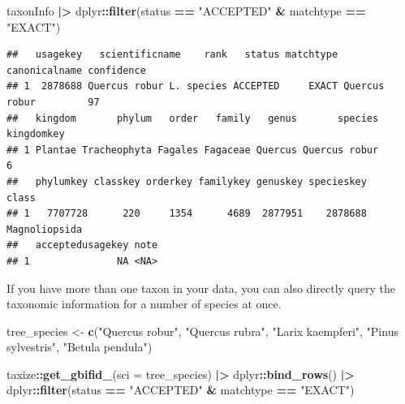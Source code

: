 \documentclass[
]{book}
\newenvironment{Shaded}{\begin{snugshade}}{\end{snugshade}}
\newcommand{\AttributeTok}[1]{\textcolor[rgb]{0.13,0.29,0.53}{#1}}
\newcommand{\FunctionTok}[1]{\textcolor[rgb]{0.13,0.29,0.53}{\textbf{#1}}}
\newcommand{\NormalTok}[1]{#1}
\newcommand{\OtherTok}[1]{\textcolor[rgb]{0.56,0.35,0.01}{#1}}
\newcommand{\SpecialCharTok}[1]{\textcolor[rgb]{0.81,0.36,0.00}{\textbf{#1}}}
\newcommand{\StringTok}[1]{\textcolor[rgb]{0.31,0.60,0.02}{#1}}
\begin{document}
\begin{Shaded}
\begin{Highlighting}[]
\NormalTok{taxonInfo }\SpecialCharTok{|\textgreater{}} 
\NormalTok{  dplyr}\SpecialCharTok{::}\FunctionTok{filter}\NormalTok{(status }\SpecialCharTok{==} \StringTok{"ACCEPTED"} \SpecialCharTok{\&}\NormalTok{ matchtype }\SpecialCharTok{==} \StringTok{"EXACT"}\NormalTok{)}
\end{Highlighting}
\end{Shaded}

\begin{verbatim}
##   usagekey   scientificname    rank   status matchtype canonicalname confidence
## 1  2878688 Quercus robur L. species ACCEPTED     EXACT Quercus robur         97
##   kingdom       phylum   order   family   genus       species kingdomkey
## 1 Plantae Tracheophyta Fagales Fagaceae Quercus Quercus robur          6
##   phylumkey classkey orderkey familykey genuskey specieskey         class
## 1   7707728      220     1354      4689  2877951    2878688 Magnoliopsida
##   acceptedusagekey note
## 1               NA <NA>
\end{verbatim}

If you have more than one taxon in your data, you can also directly query the taxonomic information for a number of species at once.

\begin{Shaded}
\begin{Highlighting}[]
\NormalTok{tree\_species }\OtherTok{\textless{}{-}} \FunctionTok{c}\NormalTok{(}\StringTok{"Quercus robur"}\NormalTok{, }\StringTok{"Quercus rubra"}\NormalTok{, }\StringTok{"Larix kaempferi"}\NormalTok{, }\StringTok{"Pinus sylvestris"}\NormalTok{, }\StringTok{"Betula pendula"}\NormalTok{)}

\NormalTok{taxize}\SpecialCharTok{::}\FunctionTok{get\_gbifid\_}\NormalTok{(}\AttributeTok{sci =}\NormalTok{ tree\_species) }\SpecialCharTok{|\textgreater{}}
\NormalTok{  dplyr}\SpecialCharTok{::}\FunctionTok{bind\_rows}\NormalTok{() }\SpecialCharTok{|\textgreater{}}
\NormalTok{  dplyr}\SpecialCharTok{::}\FunctionTok{filter}\NormalTok{(status }\SpecialCharTok{==} \StringTok{"ACCEPTED"} \SpecialCharTok{\&}\NormalTok{ matchtype }\SpecialCharTok{==} \StringTok{"EXACT"}\NormalTok{)}
\end{Highlighting}
\end{Shaded}
\end{document}
